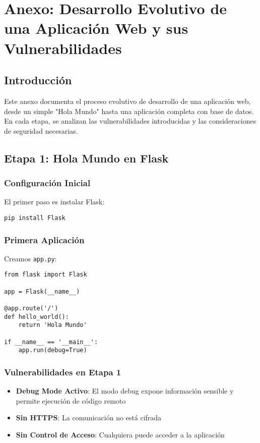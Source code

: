 \chapter{Anexo: Desarrollo Evolutivo de una Aplicación Web y sus Vulnerabilidades}

\section{Introducción}
Este anexo documenta el proceso evolutivo de desarrollo de una aplicación web, desde un simple "Hola Mundo" hasta una aplicación completa con base de datos. En cada etapa, se analizan las vulnerabilidades introducidas y las consideraciones de seguridad necesarias.

\section{Etapa 1: Hola Mundo en Flask}

\subsection{Configuración Inicial}
El primer paso es instalar Flask:
\begin{verbatim}
pip install Flask
\end{verbatim}

\subsection{Primera Aplicación}
Creamos \texttt{app.py}:
\begin{verbatim}
from flask import Flask

app = Flask(__name__)

@app.route('/')
def hello_world():
    return 'Hola Mundo'

if __name__ == '__main__':
    app.run(debug=True)
\end{verbatim}

\subsection{Vulnerabilidades en Etapa 1}
\begin{itemize}
    \item \textbf{Debug Mode Activo}: El modo debug expone información sensible y permite ejecución de código remoto
    \item \textbf{Sin HTTPS}: La comunicación no está cifrada
    \item \textbf{Sin Control de Acceso}: Cualquiera puede acceder a la aplicación
\end{itemize}

